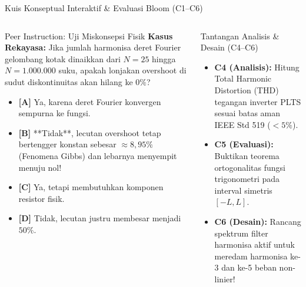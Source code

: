 \documentclass[aspectratio=169,10pt]{beamer}
\begin{document}
\begin{frame}{Kuis Konseptual Interaktif \& Evaluasi Bloom (C1--C6)}
  \begin{columns}[t]
    \begin{alertblock}{Peer Instruction: Uji Miskonsepsi Fisik}
      \footnotesize
      \textbf{Kasus Rekayasa:} Jika jumlah harmonisa deret Fourier gelombang kotak dinaikkan dari $N = 25$ hingga $N = 1.000.000$ suku, apakah lonjakan overshoot di sudut diskontinuitas akan hilang ke $0\%$?
      \vspace{0.05cm}
      \begin{itemize}\setlength{\itemsep}{1pt}
        \item \textbf{[A]} Ya, karena deret Fourier konvergen sempurna ke fungsi.
        \item \textbf{[B]} **Tidak**, lecutan overshoot tetap bertengger konstan sebesar $\approx 8{,}95\%$ (Fenomena Gibbs) dan lebarnya menyempit menuju nol!
        \item \textbf{[C]} Ya, tetapi membutuhkan komponen resistor fisik.
        \item \textbf{[D]} Tidak, lecutan justru membesar menjadi $50\%$.
      \end{itemize}
    \end{alertblock}

    \begin{block}{Tantangan Analisis \& Desain (C4--C6)}
      \footnotesize
      \begin{itemize}\setlength{\itemsep}{2pt}
        \item \textbf{C4 (Analisis):} Hitung Total Harmonic Distortion (THD) tegangan inverter PLTS sesuai batas aman IEEE Std 519 ($<5\%$).
        \item \textbf{C5 (Evaluasi):} Buktikan teorema ortogonalitas fungsi trigonometri pada interval simetris $[-L, L]$.
        \item \textbf{C6 (Desain):} Rancang spektrum filter harmonisa aktif untuk meredam harmonisa ke-3 dan ke-5 beban non-linier!
      \end{itemize}
    \end{block}
  \end{columns}
\end{frame}
\end{document}

